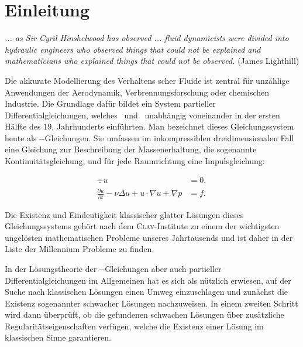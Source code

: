 \chapter*{Einleitung}

\begin{addmargin}[2em]{2em}%
  \textit{... as Sir Cyril Hinshelwood has observed ... fluid dynamicists
were divided into hydraulic engineers who observed things that
could not be explained and mathematicians who explained things
that could not be observed.} 
  \flushright(James Lighthill)
\end{addmargin}
\vspace{1.5cm}

Die akkurate Modellierung des Verhaltens \newton scher Fluide ist zentral für unzählige Anwendungen der Aerodynamik, Verbrennungsforschung oder chemischen Industrie.
Die Grundlage dafür bildet ein System partieller Differentialgleichungen, welches \navier\ und \stokes\ unabhängig voneinander in der ersten Hälfte des 19. Jahrhunderts einführten. 
Man bezeichnet dieses Gleichungssystem heute als \navier\hyp\stokes\hyp{}Gleichungen.
Sie umfassen im inkompressiblen dreidimensionalen Fall eine Gleichung zur Beschreibung der Massenerhaltung, die sogenannte Kontinuitätsgleichung, und für jede Raumrichtung eine Impulsgleichung:

\begin{align*}
  \div u &= 0, \\
  \frac{\partial u}{\partial t} - \nu \Delta u + u \cdot \nabla u + \nabla p &= f.
\end{align*}

Die Existenz und Eindeutigkeit klassischer glatter Lösungen dieses Gleichungssystems gehört nach dem \textsc{Clay}\hyp{}Institute zu einem der wichtigsten ungelösten mathematischen Probleme unseres Jahrtausends und ist daher in der Liste der Millennium Probleme zu finden.

In der Lösungstheorie der \navier\hyp\stokes\hyp{}Gleichungen aber auch partieller Differentialgleichungen im Allgemeinen hat es sich als nützlich erwiesen, auf der Suche nach klassischen Lösungen einen Umweg einzuschlagen und zunächst die Existenz sogenannter schwacher Lösungen nachzuweisen.
In einem zweiten Schritt wird dann überprüft, ob die gefundenen schwachen Lösungen über zusätzliche Regularitätseigenschaften verfügen, welche die Existenz einer Lösung im klassischen Sinne garantieren.

